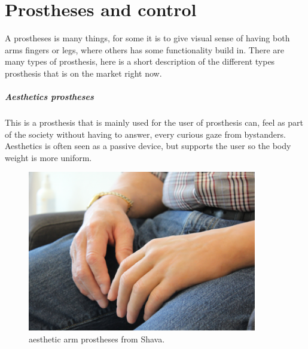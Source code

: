 \chapter{Prostheses and control} \label{prostheses}

A prostheses is many things, for some it is to give visual sense of having both arms fingers or legs, where others has some functionality build in.
There are many types of prosthesis, here is a short description of the different types prosthesis that is on the market right now.

\paragraph{Aesthetics prostheses}
This is a prosthesis that is mainly used for the user of prosthesis can, feel as part of the society without having to answer, every curious gaze from bystanders. Aesthetics is often seen as a passive device, but supports the user so the body weight is more uniform\cite{aesthetic}.  
\begin{figure}[H]
    \centering
    \includegraphics[width=10cm,height=7cm]{Figures/Contextual_figures/ProsthesesPics/aestikarm.png}
    \caption{aesthetic arm prostheses from Shava\cite{aesthetic}.}
    \label{fig:aesthetic}
\end{figure}
